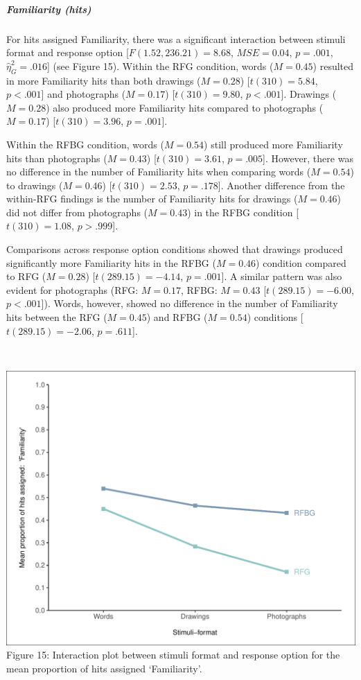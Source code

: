\documentclass[
  11pt,
]{article}
\begin{document}
\hypertarget{familiarity-hits}{%
\subparagraph{Familiarity (hits)}\label{familiarity-hits}}

For hits assigned Familiarity, there was a significant interaction
between stimuli format and response option
{[}\(F(1.52, 236.21) = 8.68\), \(\mathit{MSE} = 0.04\), \(p = .001\),
\(\hat{\eta}^2_G = .016\){]} (see Figure 15). Within the RFG condition,
words (\(M = 0.45\)) resulted in more Familiarity hits than both
drawings (\(M = 0.28\)) {[}\(t(310) = 5.84\), \(p < .001\){]} and
photographs (\(M = 0.17\)) {[}\(t(310) = 9.80\), \(p < .001\){]}.
Drawings (\(M = 0.28\)) also produced more Familiarity hits compared to
photographs (\(M = 0.17\)) {[}\(t(310) = 3.96\), \(p = .001\){]}.

Within the RFBG condition, words (\(M = 0.54\)) still produced more
Familiarity hits than photographs (\(M = 0.43\)) {[}\(t(310) = 3.61\),
\(p = .005\){]}. However, there was no difference in the number of
Familiarity hits when comparing words (\(M = 0.54\)) to drawings
(\(M = 0.46\)) {[}\(t(310) = 2.53\), \(p = .178\){]}. Another difference
from the within-RFG findings is the number of Familiarity hits for
drawings (\(M = 0.46\)) did not differ from photographs (\(M = 0.43\))
in the RFBG condition {[}\(t(310) = 1.08\), \(p > .999\){]}.

Comparisons across response option conditions showed that drawings
produced significantly more Familiarity hits in the RFBG (\(M = 0.46\))
condition compared to RFG (\(M = 0.28\)) {[}\(t(289.15) = -4.14\),
\(p = .001\){]}. A similar pattern was also evident for photographs
(RFG: \(M = 0.17\), RFBG: \(M = 0.43\) {[}\(t(289.15) = -6.00\),
\(p < .001\){]}). Words, however, showed no difference in the number of
Familiarity hits between the RFG (\(M = 0.45\)) and RFBG (\(M = 0.54\))
conditions {[}\(t(289.15) = -2.06\), \(p = .611\){]}.

~

\includegraphics{R--Thesis_files/figure-latex/unnamed-chunk-40-1.pdf}
Figure 15: Interaction plot between stimuli format and response option
for the mean proportion of hits assigned `Familiarity'.
\end{document}
